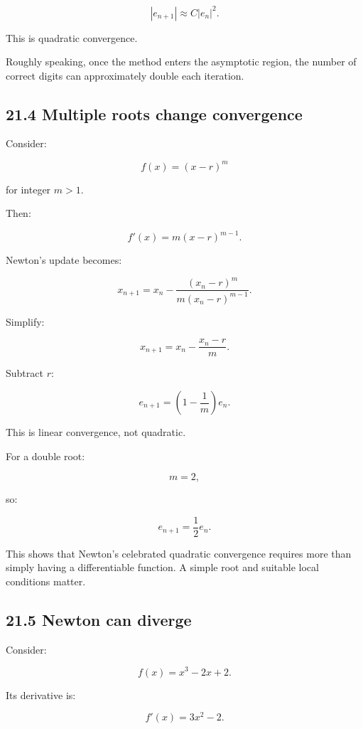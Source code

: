 \[ \boxed{ |e_{n+1}|\approx C|e_n|^2 }. \]

This is quadratic convergence.

Roughly speaking, once the method enters the asymptotic region, the number of correct digits can approximately double each iteration.

\subsection{21.4 Multiple roots change convergence}\label{02-foundations-ii-ch028-multiple-roots-change-convergence}

\hypertarget{02-foundations-ii-ch028-multiple-roots-change-convergence}{}

Consider:

\[ f(x)=(x-r)^m \]

for integer \(m>1\).

Then:

\[ f'(x)=m(x-r)^{m-1}. \]

Newton's update becomes:

\[ x_{n+1} = x_n- \frac{(x_n-r)^m}{m(x_n-r)^{m-1}}. \]

Simplify:

\[ x_{n+1} = x_n-\frac{x_n-r}{m}. \]

Subtract \(r\):

\[ \boxed{ e_{n+1} = \left(1-\frac1m\right)e_n }. \]

This is linear convergence, not quadratic.

For a double root:

\[ m=2, \]

so:

\[ e_{n+1}=\frac12e_n. \]

This shows that Newton's celebrated quadratic convergence requires more than simply having a differentiable function. A simple root and suitable local conditions matter.

\subsection{21.5 Newton can diverge}\label{02-foundations-ii-ch028-newton-can-diverge}

\hypertarget{02-foundations-ii-ch028-newton-can-diverge}{}

Consider:

\[ f(x)=x^3-2x+2. \]

Its derivative is:

\[ f'(x)=3x^2-2. \]

